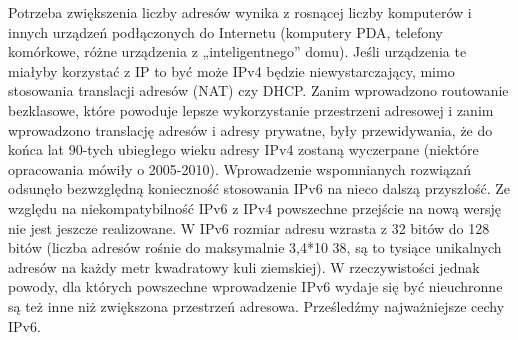 


    Potrzeba zwiększenia liczby adresów wynika z rosnącej liczby komputerów i innych urządzeń
    podłączonych do Internetu (komputery PDA, telefony komórkowe, różne urządzenia z
    „inteligentnego” domu). Jeśli urządzenia te miałyby korzystać z IP to być może IPv4 będzie
    niewystarczający, mimo stosowania translacji adresów (NAT) czy DHCP.
    Zanim wprowadzono routowanie bezklasowe, które powoduje lepsze wykorzystanie
    przestrzeni adresowej i zanim wprowadzono translację adresów i adresy prywatne, były
    przewidywania, że do końca lat 90-tych ubiegłego wieku adresy IPv4 zostaną wyczerpane
    (niektóre opracowania mówiły o 2005-2010). Wprowadzenie wspomnianych rozwiązań
    odsunęło bezwzględną konieczność stosowania IPv6 na nieco dalszą przyszłość. Ze względu
    na niekompatybilność IPv6 z IPv4 powszechne przejście na nową wersję nie jest jeszcze
    realizowane.
    W IPv6 rozmiar adresu wzrasta z 32 bitów do 128 bitów (liczba adresów rośnie do
    maksymalnie 3,4*10 38, są to tysiące unikalnych adresów na każdy metr kwadratowy kuli
    ziemskiej).
    W rzeczywistości jednak powody, dla których powszechne wprowadzenie IPv6 wydaje się
    być nieuchronne są też inne niż zwiększona przestrzeń adresowa. Prześledźmy najważniejsze
    cechy IPv6.


